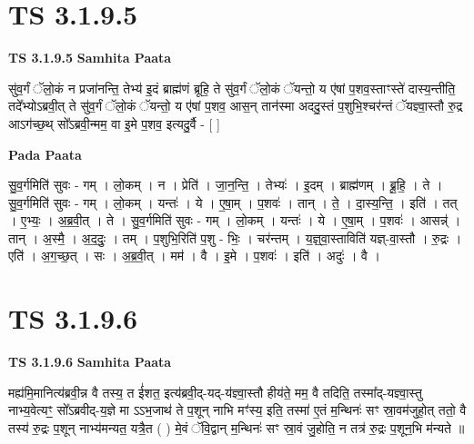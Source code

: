\documentclass[17pt]{extarticle}
\begin{document}
\section*{ TS 3.1.9.5 }

\textbf{TS 3.1.9.5 } \newline
\textbf{Samhita Paata} \newline

सु॑व॒र्गं ॅलो॒कं न प्रजा॑नन्ति॒ तेभ्य॑ इ॒दं ब्राह्म॑णं ब्रूहि॒ ते सु॑व॒र्गं ॅलो॒कं ॅयन्तो॒ य ए॑षां प॒शव॒स्ताꣳस्ते॑ दास्य॒न्तीति॒ तदे᳚भ्योऽब्रवी॒त् ते सु॑व॒र्गं ॅलो॒कं ॅयन्तो॒ य ए॑षां प॒शव॒ आस॒न् तान॑स्मा अददु॒स्तं प॒शुभि॒श्चर॑न्तं ॅयज्ञ्वा॒स्तौ रु॒द्र आऽग॑च्छ॒थ् सो᳚ऽब्रवी॒न्मम॒ वा इ॒मे प॒शव॒ इत्यदु॒र्वै - [  ] \newline

\textbf{Pada Paata} \newline

सु॒व॒र्गमिति॑ सुवः - गम् । लो॒कम् । न । प्रेति॑ । जा॒न॒न्ति॒ । तेभ्यः॑ । इ॒दम् । ब्राह्म॑णम् । ब्रू॒हि॒ । ते । सु॒व॒र्गमिति॑ सुवः - गम् । लो॒कम् । यन्तः॑ । ये । ए॒षा॒म् । प॒शवः॑ । तान् । ते॒ । दा॒स्य॒न्ति॒ । इति॑ । तत् । ए॒भ्यः॒ । अ॒ब्र॒वी॒त् । ते । सु॒व॒र्गमिति॑ सुवः - गम् । लो॒कम् । यन्तः॑ । ये । ए॒षा॒म् । प॒शवः॑ । आसन्न्॑ । तान् । अ॒स्मै॒ । अ॒द॒दुः॒ । तम् । प॒शुभि॒रिति॑ प॒शु - भिः॒ । चर॑न्तम् । य॒ज्ञ्॒वा॒स्ताविति॑ यज्ञ्-वा॒स्तौ । रु॒द्रः । एति॑ । अ॒ग॒च्छ॒त् । सः । अ॒ब्र॒वी॒त् । मम॑ । वै । इ॒मे । प॒शवः॑ । इति॑ । अदुः॑ । वै ।  \newline




\section*{ TS 3.1.9.6 }

\textbf{TS 3.1.9.6 } \newline
\textbf{Samhita Paata} \newline

मह्य॑मि॒मानित्य॑ब्रवी॒न्न वै तस्य॒ त ई॑शत॒ इत्य॑ब्रवी॒द्-यद्-य॑ज्ञ्वा॒स्तौ हीय॑ते॒ मम॒ वै तदिति॒ तस्मा᳚द्-यज्ञ्वा॒स्तु नाभ्य॒वेत्यꣳ॒॒ सो᳚ऽब्रवीद्-य॒ज्ञे मा ऽऽभ॒जाथ॑ ते प॒शून् नाभि मꣳ॑स्य॒ इति॒ तस्मा॑ ए॒तं म॒न्थिनः॑ सꣳ स्रा॒वम॑जुहो॒त् ततो॒ वै तस्य॑ रु॒द्रः प॒शून् नाभ्य॑मन्यत॒ यत्रै॒त ( ) मे॒वं ॅवि॒द्वान् म॒न्थिनः॑ सꣳ स्रा॒वं जु॒होति॒ न तत्र॑ रु॒द्रः प॒शून॒भि म॑न्यते ॥ \newline
\end{document}
